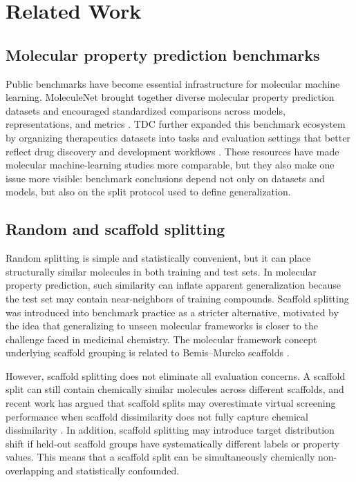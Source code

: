 \section{Related Work}

\subsection{Molecular property prediction benchmarks}

Public benchmarks have become essential infrastructure for molecular machine learning. MoleculeNet brought together diverse molecular property prediction datasets and encouraged standardized comparisons across models, representations, and metrics \citep{wu2018moleculenet}. TDC further expanded this benchmark ecosystem by organizing therapeutics datasets into tasks and evaluation settings that better reflect drug discovery and development workflows \citep{huang2021tdc}. These resources have made molecular machine-learning studies more comparable, but they also make one issue more visible: benchmark conclusions depend not only on datasets and models, but also on the split protocol used to define generalization.

\subsection{Random and scaffold splitting}

Random splitting is simple and statistically convenient, but it can place structurally similar molecules in both training and test sets. In molecular property prediction, such similarity can inflate apparent generalization because the test set may contain near-neighbors of training compounds. Scaffold splitting was introduced into benchmark practice as a stricter alternative, motivated by the idea that generalizing to unseen molecular frameworks is closer to the challenge faced in medicinal chemistry. The molecular framework concept underlying scaffold grouping is related to Bemis--Murcko scaffolds \citep{bemis1996properties}.

However, scaffold splitting does not eliminate all evaluation concerns. A scaffold split can still contain chemically similar molecules across different scaffolds, and recent work has argued that scaffold splits may overestimate virtual screening performance when scaffold dissimilarity does not fully capture chemical dissimilarity \citep{guo2024scaffold}. In addition, scaffold splitting may introduce target distribution shift if held-out scaffold groups have systematically different labels or property values. This means that a scaffold split can be simultaneously chemically non-overlapping and statistically confounded.


